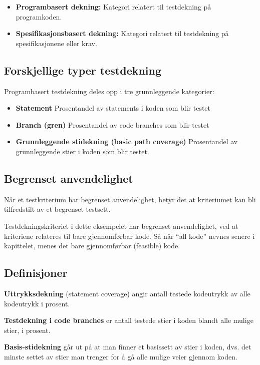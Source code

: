 \begin{itemize}
\item
  \textbf{Programbasert dekning:} Kategori relatert til testdekning på
  programkoden.
\item
  \textbf{Spesifikasjonsbasert dekning:} Kategori relatert til
  testdekning på spesifikasjonene eller krav.
\end{itemize}
\subsection{Forskjellige typer testdekning}

Programbasert testdekning deles opp i tre grunnleggende kategorier:

\begin{itemize}
\item
  \textbf{Statement} Prosentandel av statements i koden som blir testet
\item
  \textbf{Branch (gren)} Prosentandel av code branches som blir testet
\item
  \textbf{Grunnleggende stidekning (basic path coverage)} Prosentandel
  av grunnleggende stier i koden som blir testet.
\end{itemize}
\subsection{Begrenset anvendelighet}

Når et testkriterium har begrenset anvendelighet, betyr det at
kriteriumet kan bli tilfredstilt av et begrenset testsett.

Testdekningskriteriet i dette eksempelet har begrenset anvendelighet,
ved at kriteriene relateres til bare gjennomførbar kode. Så når ``all
kode'' nevnes senere i kapittelet, menes det bare gjennomførbar
(feasible) kode.

\subsection{Definisjoner}

\textbf{Uttrykksdekning} (statement coverage) angir antall testede
kodeutrykk av alle kodeutrykk i prosent.

\textbf{Testdekning i code branches} er antall testede stier i koden
blandt alle mulige stier, i prosent.

\textbf{Basis-stidekning} går ut på at man finner et basissett av stier
i koden, dvs. det minste settet av stier man trenger for å gå alle
mulige veier gjennom koden.

